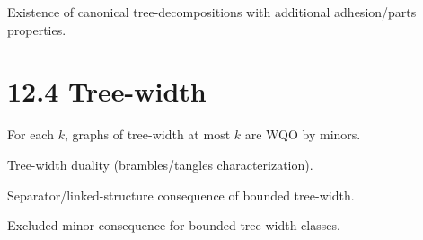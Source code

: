 \begin{theorem}
  \label{thm:td-canonical}
  Existence of canonical tree-decompositions with additional adhesion/parts
  properties.
\end{theorem}



\section{12.4 Tree-width}






\begin{theorem}
  \label{thm:bounded-treewidth-wqo}
  For each \(k\), graphs of tree-width at most \(k\) are WQO by minors.
\end{theorem}

\begin{theorem}
  \label{thm:treewidth-duality}
  Tree-width duality (brambles/tangles characterization).
\end{theorem}

\begin{theorem}
  \label{thm:treewidth-separator}
  Separator/linked-structure consequence of bounded tree-width.
\end{theorem}

\begin{theorem}
  \label{thm:treewidth-excluded-minor}
  Excluded-minor consequence for bounded tree-width classes.
\end{theorem}
















